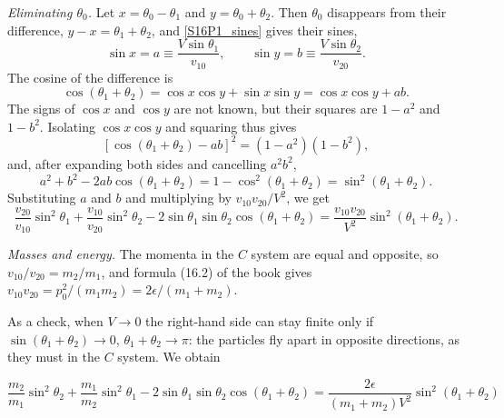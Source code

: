 \begin{problem}[title={Laboratory angles after a disintegration}]
{\textit{Eliminating $\theta_0$.} Let $x = \theta_0-\theta_1$ and $y = \theta_0+\theta_2$. Then $\theta_0$ disappears from their difference, $y - x = \theta_1+\theta_2$, and \eqref{S16P1_sines} gives their sines,
\begin{equation*}
    \sin{x} = a \equiv \frac{V\sin{\theta_1}}{v_{10}}, \qquad \sin{y} = b \equiv \frac{V\sin{\theta_2}}{v_{20}}.
\end{equation*}
The cosine of the difference is
\begin{equation*}
    \cos{(\theta_1+\theta_2)} = \cos{x}\cos{y} + \sin{x}\sin{y} = \cos{x}\cos{y} + ab.
\end{equation*}
The signs of $\cos{x}$ and $\cos{y}$ are not known, but their squares are $1-a^2$ and $1-b^2$. Isolating $\cos{x}\cos{y}$ and squaring thus gives
\begin{equation*}
    \left[ \cos{(\theta_1+\theta_2)} - ab \right]^2 = (1-a^2)(1-b^2),
\end{equation*}
and, after expanding both sides and cancelling $a^2b^2$,
\begin{equation*}
    a^2 + b^2 - 2ab\cos{(\theta_1+\theta_2)} = 1 - \cos^2{(\theta_1+\theta_2)} = \sin^2{(\theta_1+\theta_2)}.
\end{equation*}
Substituting $a$ and $b$ and multiplying by $v_{10}v_{20}/V^2$, we get
\begin{equation*}
    \frac{v_{20}}{v_{10}}\sin^2{\theta_1} + \frac{v_{10}}{v_{20}}\sin^2{\theta_2} - 2\sin{\theta_1}\sin{\theta_2}\cos{(\theta_1+\theta_2)} = \frac{v_{10}v_{20}}{V^2}\sin^2{(\theta_1+\theta_2)}.
\end{equation*}

\textit{Masses and energy.} The momenta in the $C$ system are equal and opposite, so $v_{10}/v_{20} = m_2/m_1$, and formula (16.2) of the book gives $v_{10}v_{20} = p_0^2/(m_1m_2) = 2\epsilon/(m_1+m_2)$.

As a check, when $V \rightarrow 0$ the right-hand side can stay finite only if $\sin{(\theta_1+\theta_2)} \rightarrow 0$, \ie $\theta_1+\theta_2 \rightarrow \pi$: the particles fly apart in opposite directions, as they must in the $C$ system. We obtain
}
{
\begin{equation*}
    \frac{m_2}{m_1} \sin^2{\theta_2} + \frac{m_1}{m_2} \sin^2{\theta_1} - 2 \sin{\theta_1}\sin{\theta_2}\cos{(\theta_1+\theta_2)} = \frac{2\epsilon}{(m_1+m_2)V^2} \sin^2{(\theta_1+\theta_2)}
\end{equation*}
}
\end{problem}

